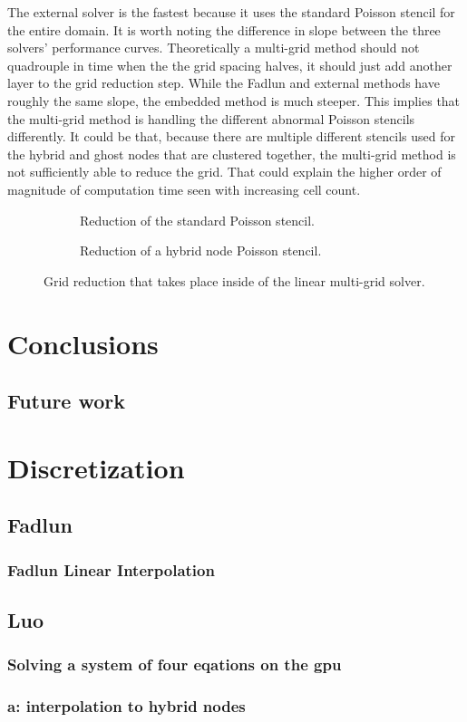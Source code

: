 \documentclass[onehalf,11pt]{beavtex}
\begin{document}
The external solver is the fastest because it uses the standard Poisson stencil for the entire domain. 
It is worth noting the difference in slope between the three solvers' performance curves. 
Theoretically a multi-grid method should not quadrouple in time when the the grid spacing halves, it should just add another layer to the grid reduction step.
While the Fadlun and external methods have roughly the same slope, the embedded method is much steeper. 
This implies that the multi-grid method is handling the different abnormal Poisson stencils differently. 
It could be that, because there are multiple different stencils used for the hybrid and ghost nodes that are clustered together, the multi-grid method is not sufficiently able to reduce the grid. 
That could explain the higher order of magnitude of computation time seen with increasing cell count. 

\begin{figure}[!htb]
	\centering
	\begin{subfigure}{0.6\textwidth}
		
		\caption{Reduction of the standard Poisson stencil.}
	\end{subfigure}
	
	\begin{subfigure}{0.6\textwidth}
		
		\caption{Reduction of a hybrid node Poisson stencil.}
	\end{subfigure}
	\caption{Grid reduction that takes place inside of the linear multi-grid solver.}
	\label{fig:gridreduce}
\end{figure}

\chapter{Conclusions}
\section{Future work}




\appendix
\chapter{Discretization}
\section{Fadlun}
\subsection{Fadlun Linear Interpolation}\label{Fadlun Linear Interpolation}
\section{Luo}
\subsection{Solving a system of four eqations on the gpu}\label{system of euqations}
\subsection{a: interpolation to hybrid nodes}
\label{a: interpolation to hybrid nodes}
\end{document}
